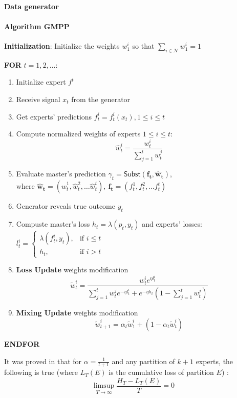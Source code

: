 \documentclass[12pt, twoside]{article}
\begin{document}
\paragraph{Data generator}
 
\paragraph{Algorithm GMPP}
\textbf{Initialization}: Initialize the weights $w^i_1$ so that $\sum_{i \in \mathcal{N}}w^i_1 = 1$

\textbf{FOR} $t = 1, 2, \dots$:
\begin{enumerate}[leftmargin=4em]
\item Initialize expert $f^t$
\item Receive signal $x_t$ from the generator 
\item Get experts' predictions $f_t^i = f_t^i(x_t), 1 \le i \le t$ 
\item Compute normalized weights of experts  $1 \le i \le t$: $$\widehat{w}^i_t = \dfrac{w^i_t}{\sum_{j=1}^t w_t^j}$$
\item Evaluate master's prediction $\gamma_t = \mathsf{Subst}(\mathbf{f_t}, \mathbf{\widehat{w}_t})$, \\ where $\mathbf{\widehat{w}_t} = (\widehat{w}_t^1, \widehat{w}_t^2, \dots \widehat{w}_t^t),\ \mathbf{f_t} = (f_t^1, f_t^2, \dots f_t^t)$
\item Generator reveals true outcome $y_t$
\item Compuste master's loss $h_t = \lambda(p_t, y_t) $ and experts' losses: $l_t^i =
\begin{cases}
        \lambda(f_t^i, y_t), & \text{if $i \le t$} \\
        h_t, & \text{if $i > t$}
\end{cases}$

\item \textbf{Loss Update} weights modification
\[  \widetilde{w}_t^i = \dfrac{w_t^i e^{\eta l_t^i}}{\sum\limits_{j = 1}^t w_t^j e^{-\eta l_t^i} + e^{-\eta h_t} (1 - \sum\limits_{j = 1}^t w_t^j) } \]
\item \textbf{Mixing Update} weights modification
\[  \widetilde{w}_{t+1}^i = \alpha_t\widetilde{w}_1^i + (1 - \alpha_t\widetilde{w}_t^i)\] 
\end{enumerate}

\textbf{ENDFOR}

\bigskip
It was proved in \cite{article} that for $\alpha = \frac1{t + 1}$ and any partition of $k+1$ experts, the following is true  (where $L_T(E)$ is the cumulative loss of partition $E$) :
\[ \limsup_{T \to \infty} \dfrac{H_T - L_T(E)}{T} = 0\] 
\end{document}
